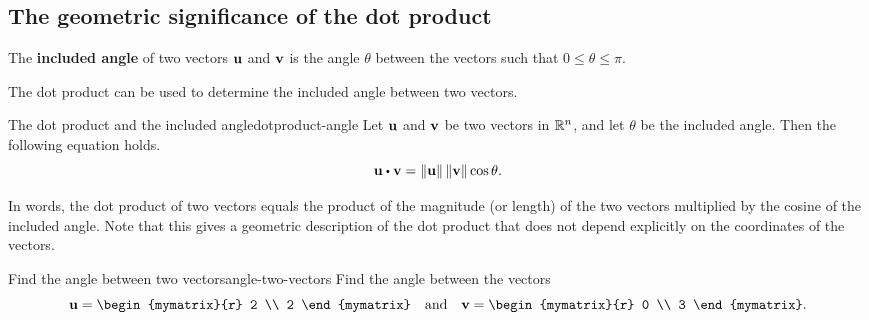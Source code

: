 \subsection{The geometric significance of the dot product}

The \textbf{included angle} of two vectors
$\mbox{\bf u}$ and $\mbox{\bf v}$ is the angle $\theta$ between the vectors
such that $0 \leq \theta \leq \pi$.
\begin{center}
\end{center}
The dot product can be used to determine the included angle between
two vectors.

\begin{proposition}{The dot product and the included angle}{dotproduct-angle}
  Let $\mbox{\bf u}$ and $\mbox{\bf v}$ be two vectors in $\mathbb{R}^n$, and let 
  $\theta$ be the included angle. Then the following equation holds.
  \begin{equation*}
    \vect{u}\dotprod \vect{v}=\norm{\vect{u}} \norm{\vect{v}} \cos \theta.
  \end{equation*}
\end{proposition}

In words, the dot product of two vectors equals the product of the
magnitude (or length) of the two vectors multiplied by the cosine of
the included angle. Note that this gives a geometric description of
the dot product that does not depend explicitly on the coordinates of
the vectors.

\begin{example}{Find the angle between two vectors}{angle-two-vectors}
Find the angle between the vectors
\begin{equation*}
  \vect{u}
  =
  \begin{mymatrix}{r}
    2 \\
    2
  \end{mymatrix}
  \quad\mbox{and}\quad
  \vect{v}
  =
  \begin{mymatrix}{r}
    0 \\
    3 
  \end{mymatrix}.
\end{equation*}
\end{example}

